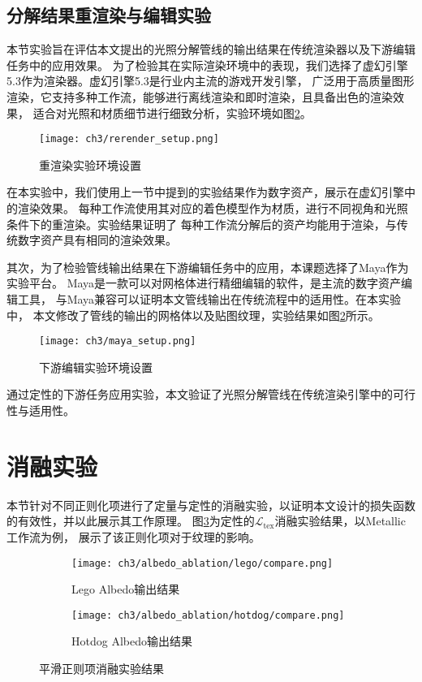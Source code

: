 \subsection{分解结果重渲染与编辑实验}

本节实验旨在评估本文提出的光照分解管线的输出结果在传统渲染器以及下游编辑任务中的应用效果。
为了检验其在实际渲染环境中的表现，我们选择了虚幻引擎5.3作为渲染器。虚幻引擎5.3是行业内主流的游戏开发引擎，
广泛用于高质量图形渲染，它支持多种工作流，能够进行离线渲染和即时渲染，且具备出色的渲染效果，
适合对光照和材质细节进行细致分析，实验环境如图\ref{fig:rerender_setup}。

\begin{figure}[htb]
  \centering
  \texttt{[image: ch3/rerender\_setup.png]}
  \caption{重渲染实验环境设置}
  \label{fig:rerender_setup}
\end{figure}

在本实验中，我们使用上一节中提到的实验结果作为数字资产，展示在虚幻引擎中的渲染效果。
每种工作流使用其对应的着色模型作为材质，进行不同视角和光照条件下的重渲染。实验结果证明了
每种工作流分解后的资产均能用于渲染，与传统数字资产具有相同的渲染效果。

其次，为了检验管线输出结果在下游编辑任务中的应用，本课题选择了Maya作为实验平台。
Maya是一款可以对网格体进行精细编辑的软件，是主流的数字资产编辑工具，
与Maya兼容可以证明本文管线输出在传统流程中的适用性。在本实验中，
本文修改了管线的输出的网格体以及贴图纹理，实验结果如图\ref{fig:rerender_setup}所示。

\begin{figure}[htb]
  \centering
  \texttt{[image: ch3/maya\_setup.png]}
  \caption{下游编辑实验环境设置}
  \label{fig:rerender_setup}
\end{figure}

\newpage

通过定性的下游任务应用实验，本文验证了光照分解管线在传统渲染引擎中的可行性与适用性。

\section{消融实验}

本节针对不同正则化项进行了定量与定性的消融实验，以证明本文设计的损失函数的有效性，并以此展示其工作原理。
图\ref{fig:l_tex_ablation}为定性的$\mathcal{L}_\text{tex}$消融实验结果，以Metallic工作流为例，
展示了该正则化项对于纹理的影响。
\begin{figure}[H]
  \centering
  \begin{subfigure}[c]{0.45\textwidth}
    \centering
    \texttt{[image: ch3/albedo\_ablation/lego/compare.png]}
    \caption{Lego Albedo输出结果}
  \end{subfigure}
  \hspace{2mm}
  \begin{subfigure}[c]{0.45\textwidth}
    \centering
    \texttt{[image: ch3/albedo\_ablation/hotdog/compare.png]}
    \caption{Hotdog Albedo输出结果}
  \end{subfigure}
  \caption{平滑正则项消融实验结果}
  \label{fig:l_tex_ablation}
\end{figure}

